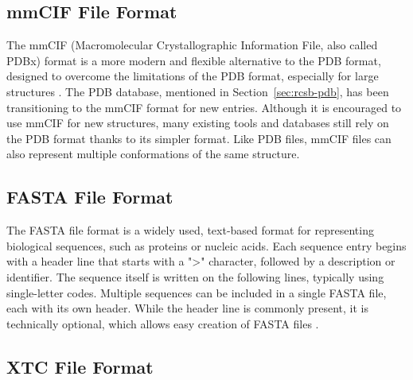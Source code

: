 \begin{figure}[H]
    \centering
    
\end{figure}


\subsection{mmCIF File Format}
\label{sec:mmcif-format}

The mmCIF (Macromolecular Crystallographic Information File, also called PDBx) format is a more modern and flexible alternative to the PDB format, designed to overcome the limitations of the PDB format, especially for large structures \cite{bourne199730}. The PDB database, mentioned in Section~\ref{sec:rcsb-pdb}, has been transitioning to the mmCIF format for new entries. Although it is encouraged to use mmCIF for new structures, many existing tools and databases still rely on the PDB format thanks to its simpler format. Like PDB files, mmCIF files can also represent multiple conformations of the same structure.

\subsection{FASTA File Format}
\label{sec:fasta-format}

The FASTA file format is a widely used, text-based format for representing biological sequences, such as proteins or nucleic acids. Each sequence entry begins with a header line that starts with a ">" character, followed by a description or identifier. The sequence itself is written on the following lines, typically using single-letter codes. Multiple sequences can be included in a single FASTA file, each with its own header. While the header line is commonly present, it is technically optional, which allows easy creation of FASTA files \cite{lipman1985rapid}.

\begin{figure}[H]
    \centering
    
\end{figure}

\subsection{XTC File Format}
\label{sec:xtc-format}

